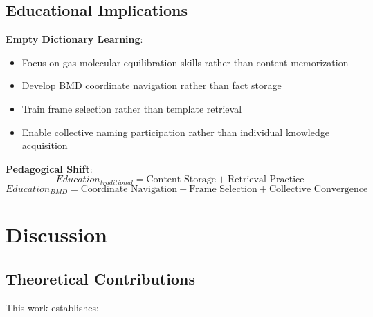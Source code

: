 \documentclass[12pt]{article}
\theoremstyle{definition}
\theoremstyle{remark}
\begin{document}
\subsection{Educational Implications}

\textbf{Empty Dictionary Learning}:
\begin{itemize}
\item Focus on gas molecular equilibration skills rather than content memorization
\item Develop BMD coordinate navigation rather than fact storage
\item Train frame selection rather than template retrieval
\item Enable collective naming participation rather than individual knowledge acquisition
\end{itemize}

\textbf{Pedagogical Shift}:
\begin{equation}
Education_{traditional} = \text{Content Storage} + \text{Retrieval Practice}
\end{equation}
\begin{equation}
Education_{BMD} = \text{Coordinate Navigation} + \text{Frame Selection} + \text{Collective Convergence}
\end{equation}

\section{Discussion}

\subsection{Theoretical Contributions}

This work establishes:
\end{document}
